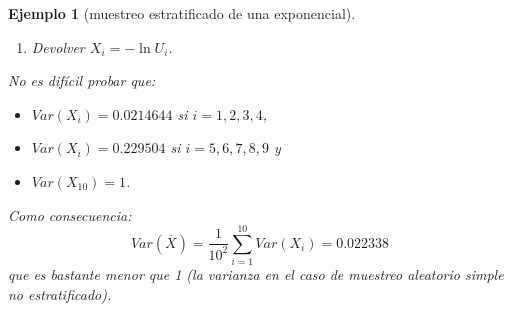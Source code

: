 \documentclass[
]{book}
\theoremstyle{break}
\newtheorem{example}{Ejemplo}[chapter]
\theoremstyle{nonumberplain}
\begin{document}
\begin{example}[muestreo estratificado de una exponencial]
\begin{enumerate}
  2a. Generar \(U\sim \mathcal{U}\left( 0,1\right)\).

  2b. Si \(i\leq4\) hacer \(U_{i} = 0.4 \cdot U + 0.6\).

  2c. Si \(4<i\leq9\) hacer \(U_{i} = 0.5 \cdot U + 0.1\).

  2d. Si \(i=10\) hacer \(U_{i} = 0.1 \cdot U\).
\item
  Devolver \(X_{i}=-\ln U_{i}\).
\end{enumerate}

No es difícil probar que:

\begin{itemize}
\item
  \(Var\left( X_{i}\right) = 0.0214644\) si \(i=1,2,3,4\),
\item
  \(Var\left( X_{i}\right) = 0.229504\) si \(i=5,6,7,8,9\) y
\item
  \(Var\left( X_{10}\right) = 1\).
\end{itemize}

Como consecuencia:
\[Var\left(  \overline{X}\right)  =\frac{1}{10^{2}}\sum_{i=1}^{10}
Var\left( X_{i} \right)  = 0.022338\]
que es bastante menor que 1 (la varianza en el caso de muestreo aleatorio simple no estratificado).
\end{example}
\end{document}
